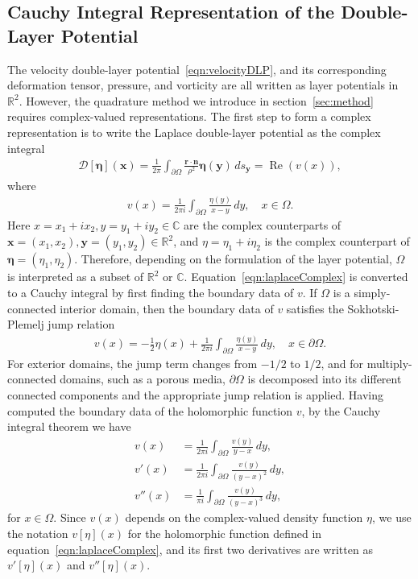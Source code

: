 \documentclass[preprint, superscriptaddress, notitlepage]{revtex4-1}
\newcommand{\Real}{\Re}
\newcommand{\bd}{{\partial}}
\newcommand{\CC}{{\mathbb{C}}}
\newcommand{\DD}{{\mathcal{D}}}
\newcommand{\eeta}{{\boldsymbol\eta}}
\newcommand{\nn}{{\mathbf{n}}}
\newcommand{\rr}{{\mathbf{r}}}
\renewcommand{\Re}{{\operatorname{Re}}}
\newcommand{\RR}{{\mathbb{R}}}
\newcommand{\xx}{{\mathbf{x}}}
\newcommand{\yy}{{\mathbf{y}}}
\begin{document}
\subsection{Cauchy Integral Representation of the Double-Layer
Potential}
\label{sec:DLPcomplex}
The velocity double-layer potential~\eqref{eqn:velocityDLP}, and its
corresponding deformation tensor, pressure, and vorticity are all
written as layer potentials in $\RR^2$.  However, the quadrature method
we introduce in section~\ref{sec:method} requires complex-valued
representations. The first step to form a complex representation is to
write the Laplace double-layer potential as the complex integral
\begin{align}
  \DD[\eeta](\xx) = \frac{1}{2\pi} \int_{\bd\Omega} 
    \frac{\rr \cdot \nn}{\rho^2}\eeta(\yy)\, ds_\yy = \Real (v(x)),
\end{align}
where
\begin{align}
  v(x) = \frac{1}{2\pi i} \int_{\bd\Omega}
    \frac{\eta(y)}{x - y} \, dy, \quad x \in \Omega.
  \label{eqn:laplaceComplex}
\end{align}
Here $x = x_1 + i x_2,y = y_1 + i y_2 \in \CC$ are the complex
counterparts of $\xx = (x_1,x_2),\yy = (y_1,y_2) \in \RR^2$, and $\eta =
\eta_1 + i \eta_2$ is the complex counterpart of $\eeta =
(\eta_1,\eta_2)$. Therefore, depending on the formulation of the layer
potential, $\Omega$ is interpreted as a subset of $\RR^2$ or $\CC$.
Equation~\eqref{eqn:laplaceComplex} is converted to a Cauchy integral by
first finding the boundary data of $v$. If $\Omega$ is a
simply-connected interior domain, then the boundary data of $v$
satisfies the Sokhotski-Plemelj jump relation
\begin{align}
  \label{eqn:SPrelation}
  v(x) = - \frac{1}{2} \eta(x) + \frac{1}{2\pi i} \int_{\bd\Omega}
    \frac{\eta(y)}{x-y}\, dy, \quad x \in \bd\Omega.
\end{align}
For exterior domains, the jump term changes from $-1/2$ to $1/2$, and
for multiply-connected domains, such as a porous media, $\bd\Omega$ is
decomposed into its different connected components and the appropriate
jump relation is applied.  Having computed the boundary data of the
holomorphic function $v$, by the Cauchy integral theorem we have
\begin{subequations}
  \label{eqn:cauchy}
  \begin{alignat}{3}
  v(x) &= \frac{1}{2\pi i}\int_{\bd\Omega} 
    \frac{v(y)}{y-x} \,dy, \\
  v'(x) &= \frac{1}{2\pi i} \int_{\bd\Omega}
    \frac{v(y)}{(y-x)^2} \, dy, \\
  v''(x) &= \frac{1}{\pi i} \int_{\bd\Omega}
    \frac{v(y)}{(y-x)^3} \, dy,
  \end{alignat}
\end{subequations}
for $x \in \Omega$.  Since $v(x)$ depends on the complex-valued density
function $\eta$, we use the notation $v[\eta](x)$ for the holomorphic
function defined in equation~\eqref{eqn:laplaceComplex}, and its first
two derivatives are written as $v'[\eta](x)$ and $v''[\eta](x)$.  
  
\end{document}
